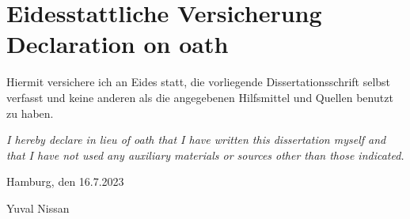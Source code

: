 \fancyhead{}
\renewcommand{\headrulewidth}{0pt}

\thispagestyle{plain}
\chapter*{Eidesstattliche Versicherung \\ Declaration on oath}

Hiermit versichere ich an Eides statt, die vorliegende Dissertationsschrift selbst verfasst und
keine anderen als die angegebenen Hilfsmittel und Quellen benutzt zu haben.

\emph{I hereby declare in lieu of oath that I have written this dissertation myself and that I have not used any auxiliary materials or sources other than those indicated.}


\vspace{1cm}

Hamburg, den 16.7.2023

\vspace{3cm}

\hspace{8cm} \hdashrule{7cm}{1pt}{1pt}

\vspace{0.1cm}

\hspace{10.2cm} Yuval Nissan


\clearpage
\thispagestyle{plain}
\newpage
\thispagestyle{plain}
\mbox{~}
\clearpage
\thispagestyle{plain}
\newpage
\thispagestyle{plain}

